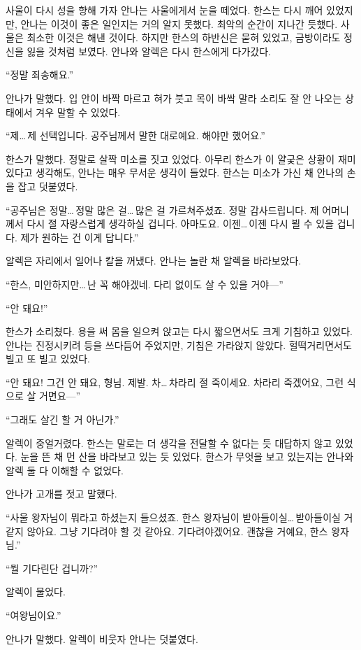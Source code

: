 사울이 다시 성을 향해 가자 안나는 사울에게서 눈을 떼었다. 한스는 다시 깨어 있었지만, 안나는 이것이 좋은 일인지는 거의 알지 못했다. 최악의 순간이 지나간 듯했다. 사울은 최소한 이것은 해낸 것이다. 하지만 한스의 하반신은 묻혀 있었고, 금방이라도 정신을 잃을 것처럼 보였다. 안나와 알렉은 다시 한스에게 다가갔다.

``정말 죄송해요.''

안나가 말했다. 입 안이 바짝 마르고 혀가 붓고 목이 바싹 말라 소리도 잘 안 나오는 상태에서 겨우 말할 수 있었다.

``제\ldots\,제 선택입니다. 공주님께서 말한 대로예요. 해야만 했어요.''

한스가 말했다. 정말로 살짝 미소를 짓고 있었다. 아무리 한스가 이 얄궂은 상황이 재미있다고 생각해도, 안나는 매우 무서운 생각이 들었다. 한스는 미소가 가신 채 안나의 손을 잡고 덧붙였다.

``공주님은 정말\ldots\,정말 많은 걸\ldots\,많은 걸 가르쳐주셨죠. 정말 감사드립니다. 제 어머니께서 다시 절 자랑스럽게 생각하실 겁니다. 아마도요. 이젠\ldots\,이젠 다시 뵐 수 있을 겁니다. 제가 원하는 건 이게 답니다.''

알렉은 자리에서 일어나 칼을 꺼냈다. 안나는 놀란 채 알렉을 바라보았다.

``한스, 미안하지만\ldots\,난 꼭 해야겠네. 다리 없이도 살 수 있을 거야—''

``안 돼요!''

한스가 소리쳤다. 용을 써 몸을 일으켜 앉고는 다시 짧으면서도 크게 기침하고 있었다. 안나는 진정시키려 등을 쓰다듬어 주었지만, 기침은 가라앉지 않았다. 헐떡거리면서도 빌고 또 빌고 있었다.

``안 돼요! 그건 안 돼요, 형님. 제발. 차\ldots\,차라리 절 죽이세요. 차라리 죽겠어요, 그런 식으로 살 거면요—''

``그래도 살긴 할 거 아닌가.''

알렉이 중얼거렸다. 한스는 말로는 더 생각을 전달할 수 없다는 듯 대답하지 않고 있었다. 눈을 뜬 채 먼 산을 바라보고 있는 듯 있었다. 한스가 무엇을 보고 있는지는 안나와 알렉 둘 다 이해할 수 없었다.

안나가 고개를 젓고 말했다.

``사울 왕자님이 뭐라고 하셨는지 들으셨죠. 한스 왕자님이 받아들이실\ldots\,받아들이실 거 같지 않아요. 그냥 기다려야 할 것 같아요. 기다려야겠어요. 괜찮을 거예요, 한스 왕자님.''

``뭘 기다린단 겁니까?''

알렉이 물었다.

``여왕님이요.''

안나가 말했다. 알렉이 비웃자 안나는 덧붙였다.

